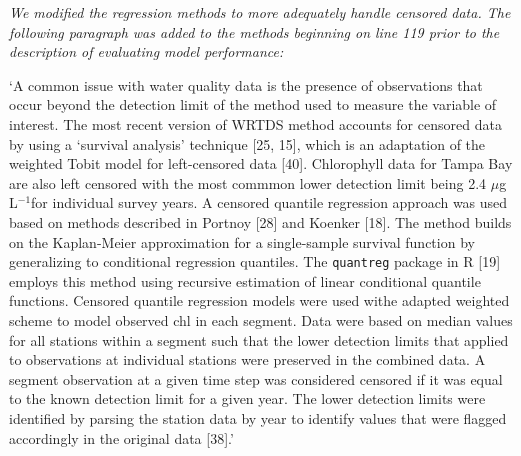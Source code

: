 \documentclass[letterpaper,12pt,oneside]{article}\usepackage[]{graphicx}\usepackage[]{color}
\newcommand{\mugl}{$\mu$g L$^{-1}$}
\begin{document}
{\it We modified the regression methods to more adequately handle censored data.  The following paragraph was added to the methods beginning on line 119 prior to the description of evaluating model performance:   

`A common issue with water quality data is the presence of observations that occur beyond the detection limit of the method used to measure the variable of interest.  The most recent version of \ac{WRTDS} method accounts for censored data by using a `survival analysis' technique [25, 15], which is an adaptation of the weighted Tobit model for left-censored data [40].  Chlorophyll data for Tampa Bay are also left censored with the most commmon lower detection limit being 2.4 \mugl for individual survey years.  A censored quantile regression approach was used based on methods described in Portnoy [28] and Koenker [18].  The method builds on the Kaplan-Meier approximation for a single-sample survival function by generalizing to conditional regression quantiles.  The \texttt{quantreg} package in R [19] employs this method using recursive estimation of linear conditional quantile functions.  Censored quantile regression models were used withe adapted weighted scheme to model observed \ac{chl} in each segment.  Data were based on median values for all stations within a segment such that the lower detection limits that applied to observations at individual stations were preserved in the combined data.  A segment observation at a given time step was considered censored if it was equal to the known detection limit for a given year.  The lower detection limits were identified by parsing the station data by year to identify values that were flagged accordingly in the original data [38].'}
\end{document}
